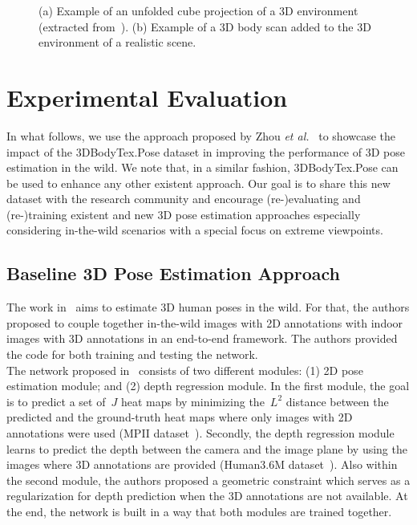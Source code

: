 \documentclass{article}
\begin{document}
\begin{figure}[t]
    \vspace{-0.5cm}
	\centering 
    \; \; \;
    \vspace{-0.3cm}
    \caption{(a) Example of an unfolded cube projection of a 3D environment (extracted from~\cite{humus-cube}). (b) Example of a 3D body scan added to the 3D environment of a realistic scene.}
    \label{fig:all_cube_3d}
    \vspace{-0.2cm}
\end{figure}


\vspace{-0.1cm}
\section{Experimental Evaluation}
\label{sec:experiments}
\vspace{-0.1cm}
In what follows, we use the approach proposed by Zhou \textit{et al.}~\cite{zhou2017towards} to showcase the impact of the 3DBodyTex.Pose dataset in improving the performance of 3D pose estimation in the wild. We note that, in a similar fashion, 3DBodyTex.Pose can be used to enhance any other existent approach. Our goal is to share this new dataset with the research community and encourage (re-)evaluating and (re-)training existent and new 3D pose estimation approaches especially considering in-the-wild scenarios with a special focus on extreme viewpoints.

\vspace{-0.1cm}
\subsection{Baseline 3D Pose Estimation Approach}
\vspace{-0.1cm}
The work in~\cite{zhou2017towards} aims to estimate 3D human poses in the wild. For that, the authors proposed to couple together in-the-wild images with 2D annotations with indoor images with 3D annotations in an end-to-end framework. The authors provided the code for both training and testing the network. \\
The network proposed in~\cite{zhou2017towards} consists of two different modules: (1) 2D pose estimation module; and (2) depth regression module. In the first module, the goal is to predict a set of~$J$ heat maps by minimizing the~$L^2$ distance between the predicted and the ground-truth heat maps where only images with 2D annotations were used (MPII dataset~\cite{andriluka20142d}). Secondly, the depth regression module learns to predict the depth between the camera and the image plane by using the images where 3D annotations are provided (Human3.6M dataset~\cite{h36m_pami}). Also within the second module, the authors proposed a geometric constraint which serves as a regularization for depth prediction when the 3D annotations are not available. At the end, the network is built in a way that both modules are trained together. 
\end{document}
